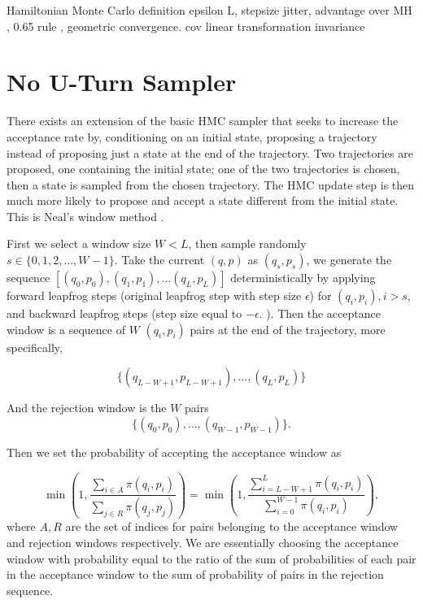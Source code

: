 \documentclass[12pt]{report}
\begin{document}
Hamiltonian Monte Carlo 
definition epsilon L, stepsize jitter, advantage over MH , 0.65 rule , geometric convergence. cov linear transformation invariance 


\section{No U-Turn Sampler}


There exists an extension of the basic HMC sampler that seeks to increase the acceptance
rate by, conditioning on an initial state, proposing a trajectory instead of proposing just a state at the end
of the trajectory. Two trajectories are proposed, one containing the initial state; one
of the two trajectories is chosen, then a state is sampled from the chosen
trajectory. The HMC update step is then much more likely to propose and accept
a state different from the initial state. This is Neal's window
method \cite{neal1992improved}. 

First we select a window size $W < L$, then sample randomly $s \in \{0, 1,2 , \dots , W -1 \}$. Take the current $(q,p)$ as $(q_s, p_s)$, we generate the sequence $[(q_0,p_0),(q_1, p_1), \dots (q_L,p_L)]$ deterministically by applying forward leapfrog steps (original leapfrog step with step size $\epsilon$) for $(q_i,p_i), i > s $, and backward leapfrog steps (step size equal to $-\epsilon$. ). 
Then the acceptance window is a sequence of $W$ $(q_i,p_i)$ pairs at the end of the trajectory, more specifically,

\[ \{(q_{L-W+1},p_{L-W+1}), \dots , (q_L,p_L)\} \]

And the rejection window is the $W$ pairs 
\[ \{(q_0,p_0), \dots, (q_{W-1},p_{W-1})\}. \]

Then we set the probability of accepting the acceptance window as 

\[ \min (1, \frac{\sum_{i\in A} \pi(q_i,p_i)}{\sum_{j \in R} \pi(q_j,p_j) }) = \min (1, \frac{\sum_{i=L-W+1}^L \pi(q_i,p_i)}{\sum_{i=0}^{W-1}\pi(q_i,p_i)}), \]
where $A,R$ are the set of indices for pairs belonging to the acceptance window and rejection windows respectively. We are essentially choosing the acceptance window with probability equal to the ratio of the sum of probabilities of each pair in the acceptance window to the sum of probability of pairs in the rejection sequence. 
\end{document}
